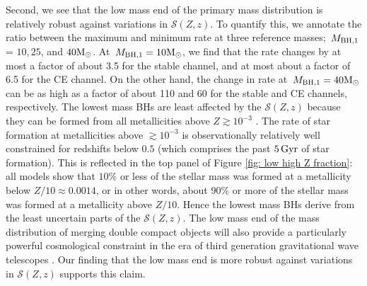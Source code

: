 \documentclass[twocolumn]{aastex631}
\newcommand{\Msun}{\ensuremath{\rm{M}_{\odot}}\xspace}
\newcommand{\Gyr}{\ensuremath{\,\rm{Gyr}}\xspace}
\newcommand{\Mbheen}{\ensuremath{\,M_{\rm BH, 1}}\xspace}
\newcommand{\SFRDzZ}{\ensuremath{\mathcal{S}(Z,z)}\xspace}
\begin{document}
Second, we see that the low mass end of the primary mass distribution is relatively robust against variations in \SFRDzZ. 
To quantify this, we annotate the ratio between the maximum and minimum rate at three reference masses; \Mbheen = $10, 25$, and $40\Msun$.
At $\Mbheen=10\Msun$, we find that the rate changes by at most a factor of about 3.5 for the stable channel, and at most about a factor of 6.5 for the CE channel. 
On the other hand, the change in rate at $\Mbheen=40\Msun$ can be as high as a factor of about 110 and 60 for the stable and CE channels, respectively. 
%
The lowest mass BHs are least affected by the \SFRDzZ because they can be formed from all metallicities above $Z\gtrsim10^{-3}$ \citep[see e.g., Figures 7 and 13 from ][]{vanson+2022}.
The rate of star formation at metallicities above $\gtrsim 10^{-3}$ is observationally relatively well constrained for redshifts below $0.5$ (which comprises the past $5\Gyr$ of star formation). 
This is reflected in the top panel of Figure \ref{fig: low high Z fraction}: all models show that $10\%$ or less of the stellar mass was formed at a metallicity below $Z/10 \approx 0.0014$, or in other words, about $90\%$ or more of the stellar mass was formed at a metallicity above $Z/10$. Hence the lowest mass BHs derive from the least uncertain parts of the \SFRDzZ.
%
The low mass end of the mass distribution of merging double compact objects will also provide a particularly powerful cosmological constraint in the era of third generation gravitational wave telescopes \citep{MariaEzquiaga2022}. Our finding that the low mass end is more robust against variations in \SFRDzZ supports this claim. 
\end{document}
